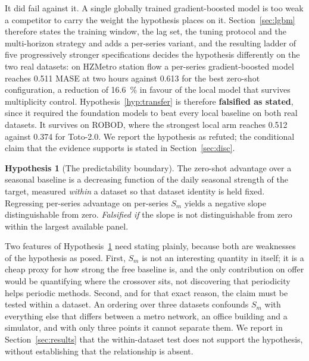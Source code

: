 \documentclass[utf8]{FrontiersinHarvard}
\newif\ifrevisionmarkup
\newcommand{\new}[1]{\ifrevisionmarkup\textcolor{revision}{#1}\else#1\fi}
\newif\ifsecondrevisionmarkup
\newcommand{\rev}[1]{\ifsecondrevisionmarkup\textcolor{revisiontwo}{#1}\else#1\fi}
\theoremstyle{plain}
\theoremstyle{definition}
\newtheorem{hypothesis}{Hypothesis}
\theoremstyle{remark}
\begin{document}
\new{It did fail against it. \rev{A single globally trained gradient-boosted model is too weak a competitor to carry the weight the hypothesis places on it. Section~\ref{sec:lgbm} therefore states the training window, the lag set, the tuning protocol and the multi-horizon strategy and adds a per-series variant, and the resulting ladder of five progressively stronger specifications decides the hypothesis differently on the two real datasets:} on HZMetro station flow a per-series gradient-boosted model reaches \num{0.511} MASE at two hours against \num{0.613} for the best zero-shot configuration, \rev{a reduction of \SI{16.6}{\percent} in favour of the local model} that survives multiplicity control. Hypothesis~\ref{hyp:transfer} is therefore \textbf{falsified as stated}, since it required the foundation models to beat every local baseline on both real datasets. It survives on ROBOD, where the strongest local arm reaches \num{0.512} against \num{0.374} for Toto-2.0. We report the hypothesis as refuted\rev{; the conditional claim that the evidence supports is stated in Section~\ref{sec:disc}}.}

\begin{hypothesis}[The predictability boundary]
\label{hyp:boundary}
The zero-shot advantage over a seasonal baseline is a decreasing function of the daily seasonal strength of the target, measured \emph{within} a dataset so that dataset identity is held fixed. Regressing per-series advantage on per-series $S_m$ yields a negative slope distinguishable from zero.
\emph{Falsified if} the slope is not distinguishable from zero within the largest available panel.
\end{hypothesis}

Two features of Hypothesis~\ref{hyp:boundary} need stating plainly, because both \rev{are weaknesses of the hypothesis as posed}. First, $S_m$ is not an interesting quantity in itself; it is a cheap proxy for how strong the free baseline is, and the only contribution on offer would be quantifying where the crossover sits, not discovering that periodicity helps periodic methods. Second, and for that exact reason, the claim must be tested within a dataset. An ordering over three datasets confounds $S_m$ with everything else that differs between a metro network, an office building and a simulator, and with only three points it cannot separate them. We report in Section~\ref{sec:results} that the within-dataset test \rev{does not support the hypothesis, without establishing that the relationship is absent}.
\end{document}
